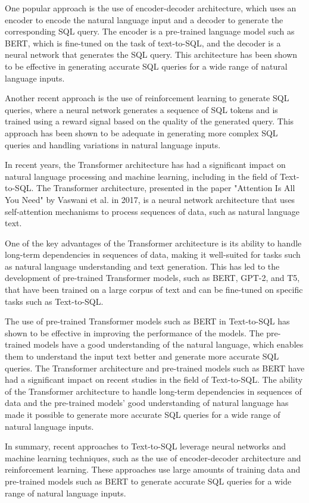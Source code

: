 One popular approach is the use of encoder-decoder architecture, which uses an encoder to encode the natural language input and a decoder to generate the corresponding SQL query. The encoder is a pre-trained language model such as BERT, which is fine-tuned on the task of text-to-SQL, and the decoder is a neural network that generates the SQL query. This architecture has been shown to be effective in generating accurate SQL queries for a wide range of natural language inputs.

Another recent approach is the use of reinforcement learning to generate SQL queries, where a neural network generates a sequence of SQL tokens and is trained using a reward signal based on the quality of the generated query. This approach has been shown to be adequate in generating more complex SQL queries and handling variations in natural language inputs.

In recent years, the Transformer architecture has had a significant impact on natural language processing and machine learning, including in the field of Text-to-SQL. The Transformer architecture, presented in the paper "Attention Is All You Need" by Vaswani et al. in 2017, is a neural network architecture that uses self-attention mechanisms to process sequences of data, such as natural language text.

One of the key advantages of the Transformer architecture is its ability to handle long-term dependencies in sequences of data, making it well-suited for tasks such as natural language understanding and text generation. This has led to the development of pre-trained Transformer models, such as BERT, GPT-2, and T5, that have been trained on a large corpus of text and can be fine-tuned on specific tasks such as Text-to-SQL.

The use of pre-trained Transformer models such as BERT in Text-to-SQL has shown to be effective in improving the performance of the models. The pre-trained models have a good understanding of the natural language, which enables them to understand the input text better and generate more accurate SQL queries.
The Transformer architecture and pre-trained models such as BERT have had a significant impact on recent studies in the field of Text-to-SQL. The ability of the Transformer architecture to handle long-term dependencies in sequences of data and the pre-trained models' good understanding of natural language has made it possible to generate more accurate SQL queries for a wide range of natural language inputs.

In summary, recent approaches to Text-to-SQL leverage neural networks and machine learning techniques, such as the use of encoder-decoder architecture and reinforcement learning. These approaches use large amounts of training data and pre-trained models such as BERT to generate accurate SQL queries for a wide range of natural language inputs.